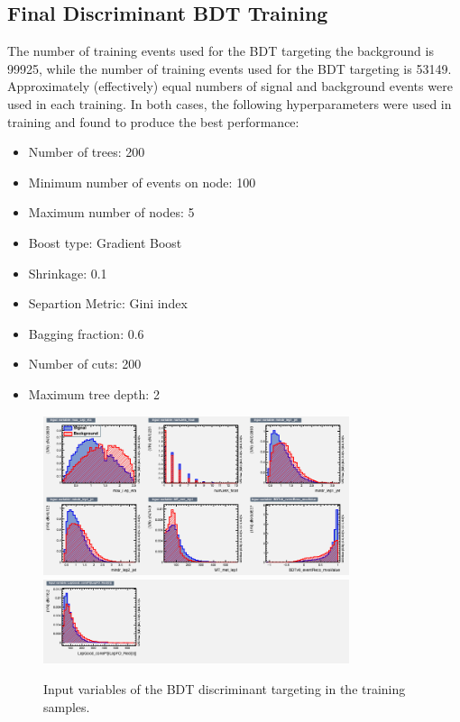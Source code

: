 \subsection{Final Discriminant BDT Training}
The number of training events used for the BDT targeting the \ttv background is 99925, while the number of training
events used for the BDT targeting \ttbar is 53149. Approximately (effectively) equal numbers of signal and background events were
used in each training. 
In both cases, the following hyperparameters were used in training and found to produce the best performance:
\begin{itemize}
\item Number of trees: 200
\item Minimum number of events on node: 100
\item Maximum number of nodes: 5
\item Boost type: Gradient Boost
\item Shrinkage: 0.1
\item Separtion Metric: Gini index
\item Bagging fraction: 0.6
\item Number of cuts: 200
\item Maximum tree depth: 2
\end{itemize}



\begin{figure}[hbtp]
 \begin{center}
   \includegraphics[width=0.8\textwidth]{ch9_figs/train_2lss_ttbar_bdtv8_value/variables_id_c1.png}
   \includegraphics[width=0.8\textwidth]{ch9_figs/train_2lss_ttbar_bdtv8_value/variables_id_c2.png}
   \caption[Input variables of the BDT discriminant targeting \ttbar]{Input variables of the BDT discriminant targeting \ttbar in the training samples.}
   \label{fig:ttbarBdt_inputs}
 \end{center}
\end{figure}

